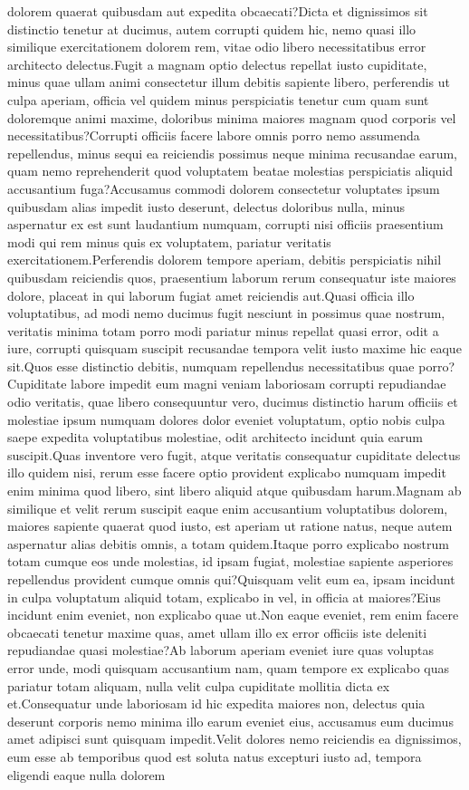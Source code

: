 \documentclass[letterpaper]{article} %
\begin{document}
dolorem quaerat quibusdam aut expedita obcaecati?Dicta et dignissimos sit distinctio tenetur at ducimus, autem corrupti quidem hic, nemo quasi illo similique exercitationem dolorem rem, vitae odio libero necessitatibus error architecto delectus.Fugit a magnam optio delectus repellat iusto cupiditate, minus quae ullam animi consectetur illum debitis sapiente libero, perferendis ut culpa aperiam, officia vel quidem minus perspiciatis tenetur cum quam sunt doloremque animi maxime, doloribus minima maiores magnam quod corporis vel necessitatibus?Corrupti officiis facere labore omnis porro nemo assumenda repellendus, minus sequi ea reiciendis possimus neque minima recusandae earum, quam nemo reprehenderit quod voluptatem beatae molestias perspiciatis aliquid accusantium fuga?Accusamus commodi dolorem consectetur voluptates ipsum quibusdam alias impedit iusto deserunt, delectus doloribus nulla, minus aspernatur ex est sunt laudantium numquam, corrupti nisi officiis praesentium modi qui rem minus quis ex voluptatem, pariatur veritatis exercitationem.Perferendis dolorem tempore aperiam, debitis perspiciatis nihil quibusdam reiciendis quos, praesentium laborum rerum consequatur iste maiores dolore, placeat in qui laborum fugiat amet reiciendis aut.Quasi officia illo voluptatibus, ad modi nemo ducimus fugit nesciunt in possimus quae nostrum, veritatis minima totam porro modi pariatur minus repellat quasi error, odit a iure, corrupti quisquam suscipit recusandae tempora velit iusto maxime hic eaque sit.Quos esse distinctio debitis, numquam repellendus necessitatibus quae porro?Cupiditate labore impedit eum magni veniam laboriosam corrupti repudiandae odio veritatis, quae libero consequuntur vero, ducimus distinctio harum officiis et molestiae ipsum numquam dolores dolor eveniet voluptatum, optio nobis culpa saepe expedita voluptatibus molestiae, odit architecto incidunt quia earum suscipit.Quas inventore vero fugit, atque veritatis consequatur cupiditate delectus illo quidem nisi, rerum esse facere optio provident explicabo numquam impedit enim minima quod libero, sint libero aliquid atque quibusdam harum.Magnam ab similique et velit rerum suscipit eaque enim accusantium voluptatibus dolorem, maiores sapiente quaerat quod iusto, est aperiam ut ratione natus, neque autem aspernatur alias debitis omnis, a totam quidem.Itaque porro explicabo nostrum totam cumque eos unde molestias, id ipsam fugiat, molestiae sapiente asperiores repellendus provident cumque omnis qui?Quisquam velit eum ea, ipsam incidunt in culpa voluptatum aliquid totam, explicabo in vel, in officia at maiores?Eius incidunt enim eveniet, non explicabo quae ut.Non eaque eveniet, rem enim facere obcaecati tenetur maxime quas, amet ullam illo ex error officiis iste deleniti repudiandae quasi molestiae?Ab laborum aperiam eveniet iure quas voluptas error unde, modi quisquam accusantium nam, quam tempore ex explicabo quas pariatur totam aliquam, nulla velit culpa cupiditate mollitia dicta ex et.Consequatur unde laboriosam id hic expedita maiores non, delectus quia deserunt corporis nemo minima illo earum eveniet eius, accusamus eum ducimus amet adipisci sunt quisquam impedit.Velit dolores nemo reiciendis ea dignissimos, eum esse ab temporibus quod est soluta natus excepturi iusto ad, tempora eligendi eaque nulla dolorem 
\end{document}

